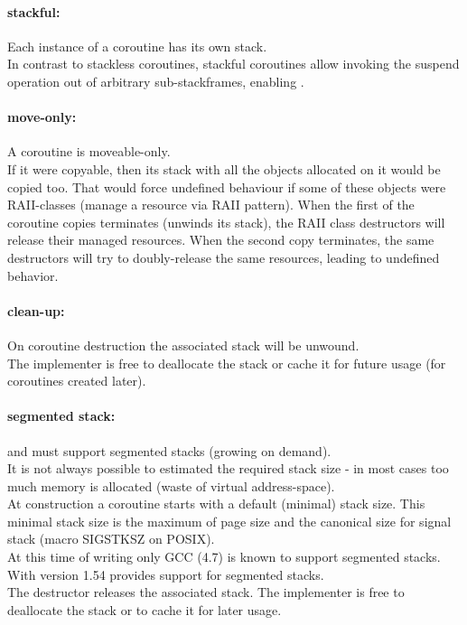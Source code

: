 \paragraph*{stackful:}
Each instance of a coroutine has its own stack.\\
\newline
In contrast to stackless coroutines, stackful coroutines allow invoking the
suspend operation out of arbitrary sub-stackframes, enabling \escreops.

\paragraph*{move-only:}
A coroutine is moveable-only.\\
\newline
If it were copyable, then its stack with all the objects allocated on it
would be copied too. That would force undefined behaviour if some of these objects
were RAII-classes (manage a resource via RAII pattern). When the first of the
coroutine copies terminates (unwinds its stack), the RAII class destructors will
release their managed resources. When the second copy terminates, the same
destructors will try to doubly-release the same resources, leading to undefined
behavior.

\paragraph*{clean-up:}
On coroutine destruction the associated stack will be unwound.\\
\newline
The implementer is free to deallocate the stack or cache it for future usage
(for coroutines created later).

\paragraph*{segmented stack:}
\pushcoro and \pullcoro must support segmented stacks (growing on demand).\\
\newline
It is not always possible to estimated the required stack size - in most cases
too much memory is allocated (waste of virtual address-space).\\
\newline
At construction a coroutine starts with a default (minimal) stack size. This
minimal stack size is the maximum of page size and the canonical size for signal
stack (macro SIGSTKSZ on POSIX).\\
\newline
At this time of writing only GCC (4.7)\cite{gccsplit} is known to support
segmented stacks. With version 1.54 \boostcoroutine provides support for
segmented stacks.\\
\newline
The destructor releases the associated stack. The implementer is free to
deallocate the stack or to cache it for later usage.

